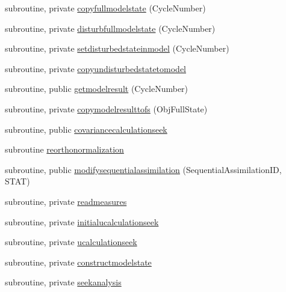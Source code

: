 \begin{DoxyCompactItemize}
\item 
subroutine, private \mbox{\hyperlink{namespacemodulesequentialassimilation_a19283cb361ee6cdaa626fd20bad85d11}{copyfullmodelstate}} (Cycle\+Number)
\item 
subroutine, private \mbox{\hyperlink{namespacemodulesequentialassimilation_a30f7a4267c0bcf30928733c782104389}{disturbfullmodelstate}} (Cycle\+Number)
\item 
subroutine, private \mbox{\hyperlink{namespacemodulesequentialassimilation_a063e8f5d94cc80db103c79a0ec38a127}{setdisturbedstateinmodel}} (Cycle\+Number)
\item 
subroutine, private \mbox{\hyperlink{namespacemodulesequentialassimilation_ad07159048364faf26c59ebffd5b246a3}{copyundisturbedstatetomodel}}
\item 
subroutine, public \mbox{\hyperlink{namespacemodulesequentialassimilation_a817e5028ea901157ba1c90a514305c15}{getmodelresult}} (Cycle\+Number)
\item 
subroutine, private \mbox{\hyperlink{namespacemodulesequentialassimilation_a1a5a1be9fa72ef3b8fe621128b7e3759}{copymodelresulttofs}} (Obj\+Full\+State)
\item 
subroutine, public \mbox{\hyperlink{namespacemodulesequentialassimilation_a89d62f9ba6c7cad76cf6a6dd37165fab}{covariancecalculationseek}}
\item 
subroutine \mbox{\hyperlink{namespacemodulesequentialassimilation_aaf3bc60a00c40a50536d48987d7294dd}{reorthonormalization}}
\item 
subroutine, public \mbox{\hyperlink{namespacemodulesequentialassimilation_a4b01359595340ca852b276b1258601df}{modifysequentialassimilation}} (Sequential\+Assimilation\+ID, S\+T\+AT)
\item 
subroutine, private \mbox{\hyperlink{namespacemodulesequentialassimilation_a7972ca7b3c19868e67ca455d375e45af}{readmeasures}}
\item 
subroutine, private \mbox{\hyperlink{namespacemodulesequentialassimilation_a33c7157ae5930272ff775ccd732bcb33}{initialucalculationseek}}
\item 
subroutine, private \mbox{\hyperlink{namespacemodulesequentialassimilation_a413c75d9b44cd4a5fdf9caf890550305}{ucalculationseek}}
\item 
subroutine, private \mbox{\hyperlink{namespacemodulesequentialassimilation_abc672947c709e077d461068b3e7ae140}{constructmodelstate}}
\item 
subroutine, private \mbox{\hyperlink{namespacemodulesequentialassimilation_a1cda513ededcf93d8f84bd9f6e39ba43}{seekanalysis}}

\end{DoxyCompactItemize}
